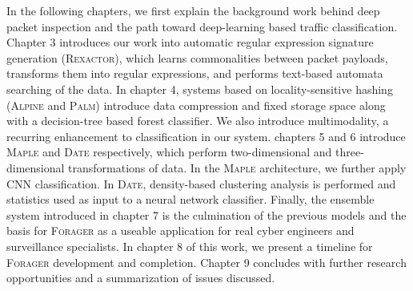 In the following chapters, we first explain the background work behind deep packet inspection and the path toward deep-learning based traffic classification. Chapter 3 introduces our work into automatic regular expression signature generation (\textsc{Rexactor}), which learns commonalities between packet payloads, transforms them into regular expressions, and performs text-based automata searching of the data. In chapter 4, systems based on locality-sensitive hashing (\textsc{Alpine} and \textsc{Palm}) introduce data compression and fixed storage space along with a decision-tree based forest classifier. We also introduce multimodality, a recurring enhancement to classification in our system. chapters 5 and 6 introduce \textsc{Maple} and \textsc{Date} respectively, which perform two-dimensional and three-dimensional transformations of data. In the \textsc{Maple} architecture, we further apply CNN classification. In \textsc{Date}, density-based clustering analysis is performed and statistics used as input to a neural network classifier. Finally, the ensemble system introduced in chapter 7 is the culmination of the previous models and the basis for \textsc{Forager} as a useable application for real cyber engineers and surveillance specialists. In chapter 8 of this work, we present a timeline for \textsc{Forager} development and completion. Chapter 9 concludes with further research opportunities and a summarization of issues discussed.
